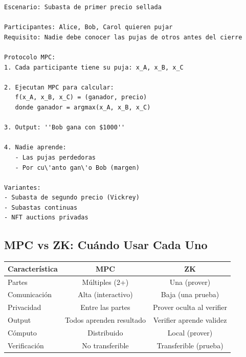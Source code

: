 \documentclass[11pt,a4paper,twoside]{book}
\begin{document}
\begin{example}
\begin{verbatim}
Escenario: Subasta de primer precio sellada

Participantes: Alice, Bob, Carol quieren pujar
Requisito: Nadie debe conocer las pujas de otros antes del cierre

Protocolo MPC:
1. Cada participante tiene su puja: x_A, x_B, x_C

2. Ejecutan MPC para calcular:
   f(x_A, x_B, x_C) = (ganador, precio)
   donde ganador = argmax(x_A, x_B, x_C)

3. Output: ''Bob gana con $1000''
   
4. Nadie aprende:
   - Las pujas perdedoras
   - Por cu\'anto gan\'o Bob (margen)

Variantes:
- Subasta de segundo precio (Vickrey)
- Subastas continuas
- NFT auctions privadas
\end{verbatim}
\end{example}

\subsection{MPC vs ZK: Cu\'ando Usar Cada Uno}

\begin{center}
\begin{tabular}{lcc}
\toprule
\textbf{Caracter\'istica} & \textbf{MPC} & \textbf{ZK} \\
\midrule
Partes & M\'ultiples (2+) & Una (prover) \\
Comunicaci\'on & Alta (interactivo) & Baja (una prueba) \\
Privacidad & Entre las partes & Prover oculta al verifier \\
Output & Todos aprenden resultado & Verifier aprende validez \\
C\'omputo & Distribuido & Local (prover) \\
Verificaci\'on & No transferible & Transferible (prueba) \\
\bottomrule
\end{tabular}
\end{center}
\end{document}
